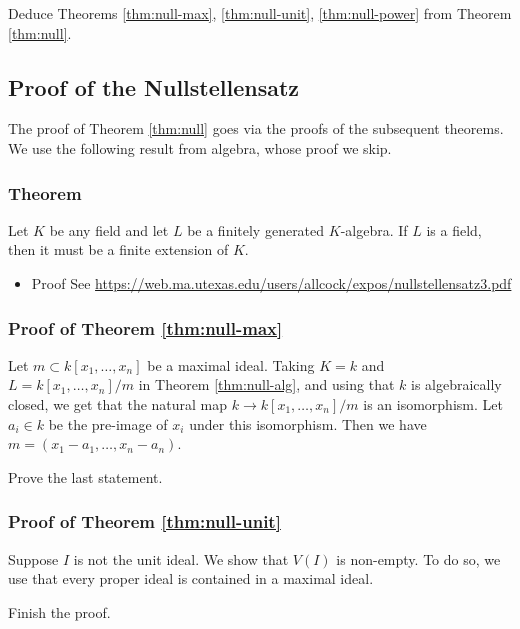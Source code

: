 \documentclass[11pt]{article}
\begin{document}
\begin{skipped}
Deduce Theorems \ref{thm:null-max}, \ref{thm:null-unit}, \ref{thm:null-power} from Theorem \ref{thm:null}.
\end{skipped}

\subsection{Proof of the Nullstellensatz}
\label{sec:orgb872649}
The proof of Theorem \ref{thm:null} goes via the proofs of the subsequent theorems.
We use the following result from algebra, whose proof we skip.

\subsubsection{Theorem}
\label{sec:org208404d}
\label{thm:null-alg}
    Let \(K\) be any field and let \(L\) be a finitely generated \(K\)-algebra.
    If \(L\) is a field, then it must be a finite extension of \(K\).

\begin{itemize}
\item Proof
\label{sec:org89306ed}
See \url{https://web.ma.utexas.edu/users/allcock/expos/nullstellensatz3.pdf}
\end{itemize}


\subsubsection{Proof of Theorem \ref{thm:null-max}}
\label{sec:org86e08dd}
Let \(m \subset k[x_1,\dots,x_n]\) be a maximal ideal.
Taking \(K = k\) and \(L = k[x_1,\dots,x_n]/m\) in Theorem \ref{thm:null-alg}, and using that \(k\) is algebraically closed, we get that the natural map \(k \to k[x_1,\dots,x_n]/m\) is an isomorphism.
Let \(a_i \in k\) be the pre-image of \(x_i\) under this isomorphism. 
Then we have \(m = (x_1-a_1,\dots,x_n-a_n)\).
\begin{skipped}
Prove the last statement.
\end{skipped}

\subsubsection{Proof of Theorem \ref{thm:null-unit}}
\label{sec:org001101a}
Suppose \(I\) is not the unit ideal. We show that \(V(I)\) is non-empty.
To do so, we use that every proper ideal is contained in a maximal ideal.
\begin{skipped}
Finish the proof.
\end{skipped}
\end{document}
